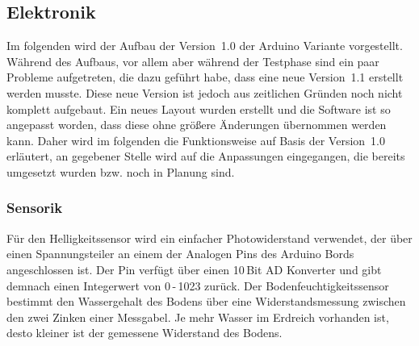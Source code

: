 \subsection{Elektronik}
Im folgenden wird der Aufbau der Version~1.0 der Arduino Variante vorgestellt. 
Während des Aufbaus, vor allem aber während der Testphase sind ein paar Probleme aufgetreten, die dazu geführt habe, dass eine neue Version~1.1 erstellt werden musste. 
Diese neue Version ist jedoch aus zeitlichen Gründen noch nicht komplett aufgebaut. 
Ein neues Layout wurden erstellt und die Software ist so angepasst worden, dass diese ohne größere Änderungen übernommen werden kann. 
Daher wird im folgenden die Funktionsweise auf Basis der Version~1.0 erläutert, an gegebener Stelle wird auf die Anpassungen eingegangen, die bereits umgesetzt wurden bzw. noch in Planung sind. 

			
\subsubsection{Sensorik} \label{sensorik}
Für den Helligkeitssensor wird ein einfacher Photowiderstand verwendet, der über einen Spannungsteiler an einem der Analogen Pins des Arduino Bords angeschlossen ist. Der Pin verfügt über einen 10\,Bit AD Konverter und gibt demnach einen Integerwert von 
0\,-\,1023 zurück.
Der Bodenfeuchtigkeitssensor bestimmt den Wassergehalt des Bodens über eine Widerstandsmessung zwischen den zwei Zinken einer Messgabel. 
Je mehr Wasser im Erdreich vorhanden ist, desto kleiner ist der gemessene Widerstand des Bodens.

